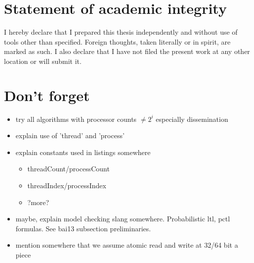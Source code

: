 \documentclass[a4paper, 10pt]{article}
\begin{document}
\section*{Statement of academic integrity}
I hereby declare that I prepared this thesis independently and without use of tools other than specified. Foreign thoughts, taken literally or in spirit, are marked as such. I also declare that I have not filed the present work at any other location or will submit it.

\pagebreak
\newpage \thispagestyle{empty} \mbox{}
\pagebreak

\renewcommand{\contentsname}{Table of contents}
\tableofcontents

\pagebreak
\newpage \thispagestyle{empty} \mbox{}
\pagebreak

\section{Don't forget}
\begin{itemize}
	\item try all algorithms with processor counts $\neq 2^i$ especially dissemination
	\item explain use of 'thread' and 'process'
	\item explain constants used in listings somewhere
		\begin{itemize}
			\item threadCount/processCount
			\item threadIndex/processIndex
			\item ?more?
		\end{itemize}
	\item maybe, explain model checking slang somewhere. Probabilistic ltl, pctl formulas. See bai13 subsection preliminaries.
	\item mention somewhere that we assume atomic read and write at 32/64 bit a piece
\end{itemize}
\end{document}
